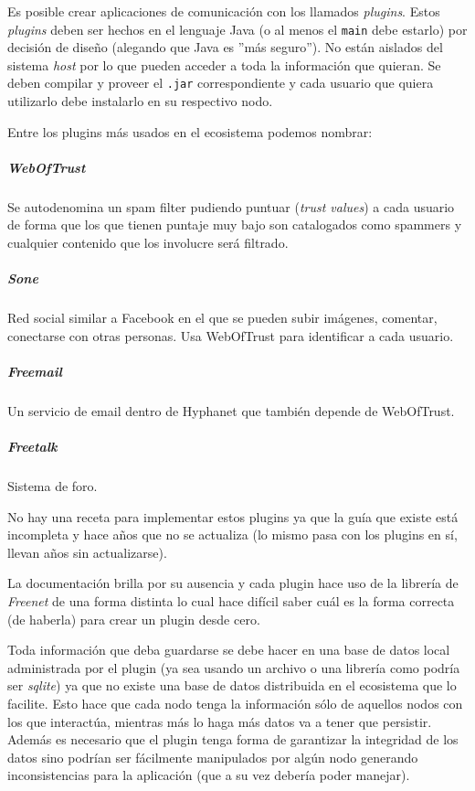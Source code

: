 Es posible crear aplicaciones de comunicación con los llamados \textit{plugins}. Estos \textit{plugins} deben ser hechos en el lenguaje Java (o al menos el \texttt{main} debe estarlo) por decisión de diseño (alegando que Java es ''más seguro''). No están aislados del sistema \textit{host} por lo que pueden acceder a toda la información que quieran. Se deben compilar y proveer el \texttt{.jar} correspondiente y cada usuario que quiera utilizarlo debe instalarlo en su respectivo nodo.

Entre los plugins más usados en el ecosistema podemos nombrar:

\subparagraph{WebOfTrust}\cite{hyphanet-web-of-trust}
Se autodenomina un spam filter pudiendo puntuar (\textit{trust values}) a cada usuario de forma que los que tienen puntaje muy bajo son catalogados como spammers y cualquier contenido que los involucre será filtrado.

\subparagraph{Sone}\cite{hyphanter-sone}
Red social similar a Facebook en el que se pueden subir imágenes, comentar, conectarse con otras personas. Usa WebOfTrust para identificar a cada usuario.

\subparagraph{Freemail}\cite{hyphanet-freemail}
Un servicio de email dentro de Hyphanet que también depende de WebOfTrust.

\subparagraph{Freetalk}\cite{hyphanet-freetalk}
Sistema de foro.

No hay una receta para implementar estos plugins ya que la guía que existe está incompleta y hace años que no se actualiza (lo mismo pasa con los plugins en sí, llevan años sin actualizarse).

La documentación brilla por su ausencia y cada plugin hace uso de la librería de \textit{Freenet} de una forma distinta lo cual hace difícil saber cuál es la forma correcta (de haberla) para crear un plugin desde cero.

Toda información que deba guardarse se debe hacer en una base de datos local administrada por el plugin (ya sea usando un archivo o una librería como podría ser \textit{sqlite}\cite{sqlite}) ya que no existe una base de datos distribuida en el ecosistema que lo facilite. Esto hace que cada nodo tenga la información sólo de aquellos nodos con los que interactúa, mientras más lo haga más datos va a tener que persistir. Además es necesario que el plugin tenga forma de garantizar la integridad de los datos sino podrían ser fácilmente manipulados por algún nodo generando inconsistencias para la aplicación (que a su vez debería poder manejar).

